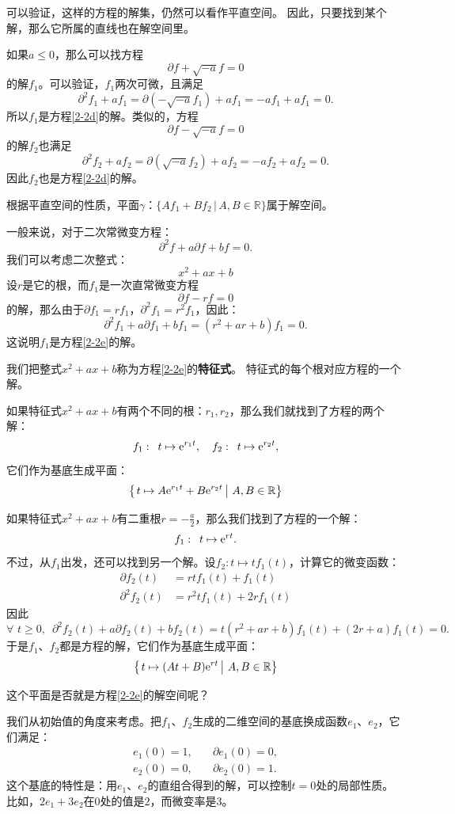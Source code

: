 \documentclass[12pt,UTF8]{ctexbook}
\begin{document}
可以验证，这样的方程的解集，仍然可以看作平直空间。
因此，只要找到某个解，那么它所属的直线也在解空间里。

如果$a\leqslant 0$，那么可以找方程
$$ \partial f + \sqrt{-a} f = 0 $$
的解$f_1$。可以验证，$f_1$两次可微，且满足
$$ \partial^2 f_1 + a f_1 = \partial (- \sqrt{-a} f_1) + af_1 = -af_1 + af_1 = 0. $$
所以$f_1$是方程\eqref{2-2d}的解。类似的，方程
$$ \partial f - \sqrt{-a} f = 0 $$
的解$f_2$也满足
$$ \partial^2 f_2 + a f_2 = \partial (\sqrt{-a} f_2) + af_2 = -af_2 + af_2 = 0. $$
因此$f_2$也是方程\eqref{2-2d}的解。

根据平直空间的性质，平面$\gamma$：$\{Af_1 + Bf_2 \, | \, A, B\in\mathbb{R}\}$属于解空间。

一般来说，对于二次常微变方程：
\begin{equation}
    \partial^2 f + a \partial f + b f = 0. \label{2-2e}
\end{equation}
我们可以考虑二次整式：
$$ x^2 + ax + b$$
设$r$是它的根，而$f_1$是一次直常微变方程
$$ \partial f - r f = 0 $$
的解，那么由于$\partial f_1 = rf_1 $，$\partial^2 f_1 = r^2f_1 $，因此：
$$ \partial^2 f_1 + a \partial f_1 + b f_1 = (r^2 + ar + b)f_1 = 0.$$
这说明$f_1$是方程\eqref{2-2e}的解。

我们把整式$ x^2 + ax + b$称为方程\eqref{2-2e}的\textbf{特征式}。
特征式的每个根对应方程的一个解。

如果特征式$x^2 + ax + b$有两个不同的根：$r_1, r_2$，那么我们就找到了方程的两个解：
$$ f_1:\,\,\, t \mapsto \mathrm{e}^{r_1t}, \quad f_2:\,\,\, t \mapsto \mathrm{e}^{r_2t}, $$
它们作为基底生成平面：
$$ \left\{\left.t \mapsto A\mathrm{e}^{r_1t} + B\mathrm{e}^{r_2t}\,\right|\, A, B \in \mathbb{R}\right\}$$

如果特征式$x^2 + ax + b$有二重根$r = -\frac{a}{2}$，那么我们找到了方程的一个解：
$$ f_1:\,\,\, t \mapsto \mathrm{e}^{rt}. $$
不过，从$f_1$出发，还可以找到另一个解。设$f_2: t\mapsto tf_1(t)$，计算它的微变函数：
\begin{align*}
    \partial f_2(t) &= rt f_1(t) + f_1(t) \\
    \partial^2 f_2(t) &= r^2 t f_1(t) + 2r f_1(t)
\end{align*}
因此
$$ \forall\,\, t \geqslant 0,\,\,\,\partial^2 f_2(t) + a \partial f_2(t) + b f_2(t) = t(r^2 + ar + b)f_1(t) + (2r + a)f_1(t) = 0.$$
于是$f_1$、$f_2$都是方程的解，它们作为基底生成平面：
$$ \left\{\left.t \mapsto (At + B)\mathrm{e}^{rt}\,\right|\, A, B \in \mathbb{R}\right\}$$

这个平面是否就是方程\eqref{2-2e}的解空间呢？

我们从初始值的角度来考虑。把$f_1$、$f_2$生成的二维空间的基底换成函数$e_1$、$e_2$，它们满足：
$$
\begin{array}{ll}
    e_1(0) = 1, &\quad \partial e_1(0) = 0, \\
    e_2(0) = 0, &\quad \partial e_2(0) = 1.
\end{array}
$$
这个基底的特性是：用$e_1$、$e_2$的直组合得到的解，可以控制$t = 0$处的局部性质。
比如，$2e_1 + 3e_2$在$0$处的值是$2$，而微变率是$3$。
\end{document}
